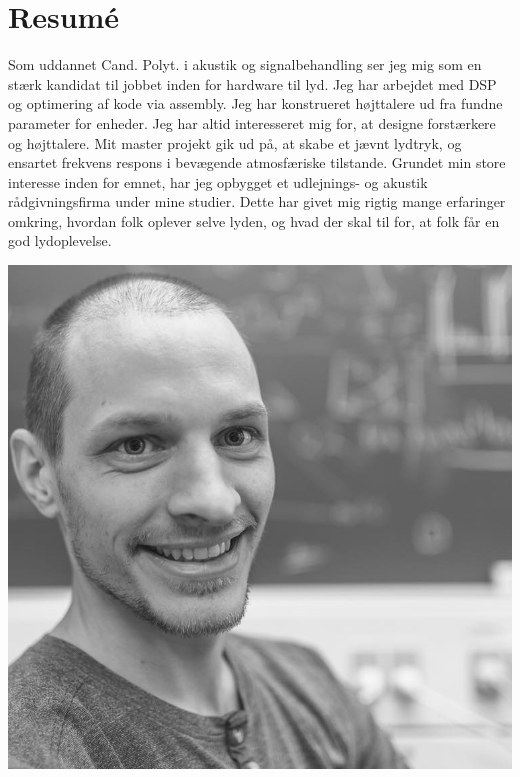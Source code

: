 \documentclass{my_cv}
\begin{document}
%
\noindent
\begin{minipage}[t]{.69\textwidth}%
    \vspace*{4pt}
    \section{Resumé}
    Som uddannet Cand. Polyt. i akustik og signalbehandling ser jeg mig som en stærk kandidat til jobbet inden for hardware til lyd. Jeg har arbejdet med DSP og optimering af kode via assembly. Jeg har konstrueret højttalere ud fra fundne parameter for enheder. Jeg har altid interesseret mig for, at designe forstærkere og højttalere. Mit master projekt gik ud på, at skabe et jævnt lydtryk, og ensartet frekvens respons i bevægende atmosfæriske tilstande. Grundet min store interesse inden for emnet, har jeg opbygget et udlejnings- og akustik rådgivningsfirma under mine studier. Dette har givet mig rigtig mange erfaringer omkring, hvordan folk oplever selve lyden, og hvad der skal til for, at folk får en god lydoplevelse.

\end{minipage}
\hfill%
\begin{minipage}[t][0.3\textwidth][b]{.29\textwidth}
	\includegraphics[width=\textwidth]{figures/mig.jpg}
\end{minipage}%
%
\end{document}
